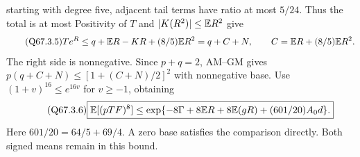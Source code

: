 starting with degree five, adjacent tail terms have ratio at most
\(5/24\). Thus the total is at most
Positivity of \(T\) and \(|K(R^2)|\le\allowbreak \mathbb E R^2\) give
\begin{equation}\tag{Q67.3.5}\label{eq:Q67:3.5}
Te^R\le q+\mathbb E R-KR+(8/5)\mathbb E R^2=q+C+N,
\qquad C=\mathbb E R+(8/5)\mathbb E R^2.
\end{equation}
The right side is nonnegative. Since \(p+q=\allowbreak 2\), AM--GM gives
\(p(q+C+N)\le\allowbreak [1+(C+N)/2]^2\) with nonnegative base.
Use \((1+v)^{16}\le\allowbreak  e^{16v}\) for \(v\ge\allowbreak -1\), obtaining
\begin{equation}\tag{Q67.3.6}\label{eq:Q67:3.6}
\boxed{\mathbb E[(pTF)^8]\le
\exp\{-8\Gamma+8\mathbb E R+8\mathbb E(gR)+(601/20)A_0d\}.}
\end{equation}
Here \(601/20=\allowbreak 64/5+69/4\). A zero base satisfies the comparison
directly. Both signed means remain in this bound.


